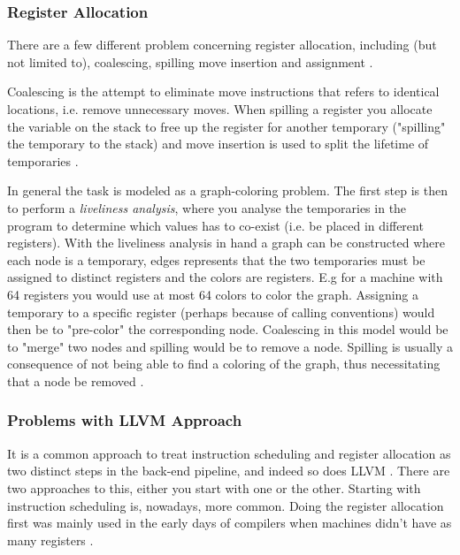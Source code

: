 \subsubsection{Register Allocation}

There are a few different problem concerning register allocation, including (but not limited
to), coalescing, spilling move insertion and assignment \cite{alloc-deconstructed,
llvm-codegenerator-allocation}.

Coalescing is the attempt to eliminate move instructions that refers to identical locations,
i.e. remove unnecessary moves. When spilling a register you allocate the variable on the
stack to free up the register for another temporary ("spilling" the temporary to the stack)
and move insertion is used to split the lifetime of temporaries \cite{alloc-deconstructed}.

In general the task is modeled as a graph-coloring problem. The first step is then to
perform a \textit{liveliness analysis}, where you analyse the temporaries in the program
to determine which values has to co-exist (i.e. be placed in different registers). With
the liveliness analysis in hand a graph can be constructed where each node is a temporary,
edges represents that the two temporaries must be assigned to distinct registers and the
colors are registers. E.g for a machine with 64 registers you would use at most 64 colors
to color the graph. Assigning a temporary to a specific register (perhaps because of
calling conventions) would then be to "pre-color" the corresponding node. Coalescing in
this model would be to "merge" two nodes and spilling would be to remove a node. Spilling
is usually a consequence of not being able to find a coloring of the graph, thus
necessitating that a node be removed \cite{alloc-deconstructed}.

\subsubsection{Problems with LLVM Approach}
It is a common approach to treat instruction scheduling and register allocation as two
distinct steps in the back-end pipeline, and indeed so does LLVM \cite[Section~11.5]{aosa-llvm}.
There are two approaches to this, either you start with one or the other. Starting with
instruction scheduling is, nowadays, more common. Doing the register allocation first was
mainly used in the early days of compilers when machines didn't have as many registers
\cite[\pno~3]{combining-alloc-sched}.

